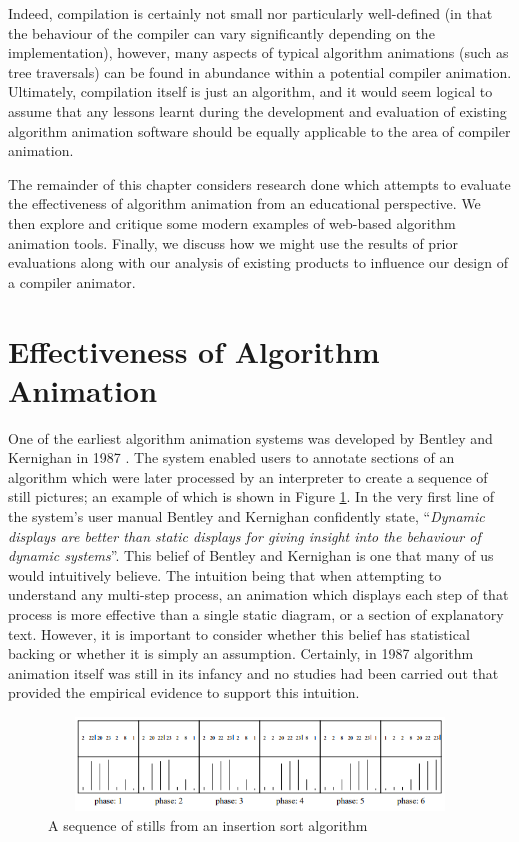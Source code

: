 \documentclass{l4proj}
\begin{document}
Indeed, compilation is certainly not small nor particularly well-defined (in that the behaviour of the compiler can vary significantly depending on the implementation), however, many aspects of typical algorithm animations (such as tree traversals) can be found in abundance within a potential compiler animation. Ultimately, compilation itself is just an algorithm,  and it would seem logical to assume that any lessons learnt during the development and evaluation of existing algorithm animation software should be equally applicable to the area of compiler animation. 

The remainder of this chapter considers research done which attempts to evaluate the effectiveness of algorithm animation from an educational perspective. We then explore and critique some modern examples of web-based algorithm animation tools. Finally, we discuss how we might use the results of prior evaluations along with our analysis of existing products to influence our design of a compiler animator.

\section{Effectiveness of Algorithm Animation}
One of the earliest algorithm animation systems was developed by Bentley and Kernighan in 1987 \cite{BentleyKernighan}. The system enabled users to annotate sections of an algorithm which were later processed by an interpreter to create a sequence of still pictures; an example of which is shown in Figure \ref{fig:bentley-kernighan}. In the very first line of the system's user manual Bentley and Kernighan confidently state, ``\textit{Dynamic displays are better than static displays for giving insight into the behaviour of dynamic systems}''. This belief of Bentley and Kernighan is one that many of us would intuitively believe. The intuition being that when attempting to understand any multi-step process, an animation which displays each step of that process is more effective than a single static diagram, or a section of explanatory text. However, it is important to consider whether this belief has statistical backing or whether it is simply an assumption. Certainly, in 1987 algorithm animation itself was still in its infancy and no studies had been carried out that provided the empirical evidence to support this intuition. 

\begin{figure}
\centering
\includegraphics[height=2.5cm,width=13cm]{images/bentleykernighan.png}
\caption{A sequence of stills from an insertion sort algorithm}
\label{fig:bentley-kernighan}	
\end{figure}
\end{document}
